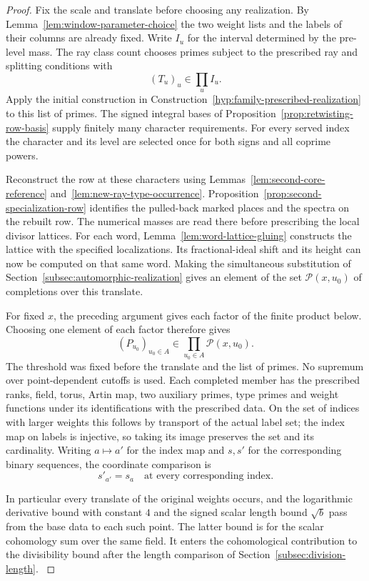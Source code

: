 \begin{proof}
Fix the scale and translate before choosing any realization. By Lemma~\ref{lem:window-parameter-choice} the two weight lists and the labels of their columns are already fixed. Write \(I_u\) for the interval determined by the pre-level mass. The ray class count chooses primes subject to the prescribed ray and splitting conditions with
\[
                   (T_u)_u\in\prod_u I_u .
\] Apply the initial construction in Construction~\ref{hyp:family-prescribed-realization} to this list of primes. The signed integral bases of Proposition~\ref{prop:retwisting-row-basis} supply finitely many character requirements. For every served index the character and its level are selected once for both signs and all coprime powers.

Reconstruct the row at these characters using Lemmas~\ref{lem:second-core-reference} and~\ref{lem:new-ray-type-occurrence}. Proposition~\ref{prop:second-specialization-row} identifies the pulled-back marked places and the spectra on the rebuilt row. The numerical masses are read there before prescribing the local divisor lattices. For each word, Lemma~\ref{lem:word-lattice-gluing} constructs the lattice with the specified localizations. Its fractional-ideal shift and its height can now be computed on that same word. Making the simultaneous substitution of Section~\ref{subsec:automorphic-realization} gives an element of the set \(\mathcal P(x,u_0)\) of completions over this translate.

For fixed \(x\), the preceding argument gives each factor of the finite product below. Choosing one element of each factor therefore gives
\[
 (P_{u_0})_{u_0\in A}\in\prod_{u_0\in A}\mathcal P(x,u_0).
\]
The threshold was fixed before the translate and the list of primes. No supremum over point-dependent cutoffs is used. Each completed member has the prescribed
ranks, field, torus, Artin map, two auxiliary primes, type
primes and weight functions under its identifications with
the prescribed data. On the set of indices with larger weights this follows by
transport of the actual label set; the index map on labels
is injective, so taking its image preserves the set and its
cardinality. Writing \(a\mapsto a'\) for the index map and \(s,s'\) for the corresponding binary sequences, the coordinate comparison is
\[
 s'_{a'}=s_a\quad\text{at every corresponding index}.
\]

In particular every translate of
the original weights occurs, and the logarithmic derivative
bound with constant \(4\) and the signed scalar length bound
\(\sqrt b\) pass from the base data to each such point. The latter
bound is for the scalar cohomology sum over the same field. It enters the
cohomological contribution to the divisibility bound after the length comparison of
Section~\ref{subsec:division-length}.
\label{cor:window-points-4}
\end{proof}

